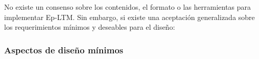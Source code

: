 No existe un consenso sobre los contenidos, el formato o las herramientas para implementar Ep-LTM.
Sin embargo, si existe una aceptaci\'on generalizada sobre los requerimientos m\'inimos y deseables para el dise\~no\cite{Vijayakumar2014}\cite{Ho2009}\cite{Stachowicz2012}\cite{Jockel2008}:

\subsubsection{Aspectos de dise\~no m\'inimos}



